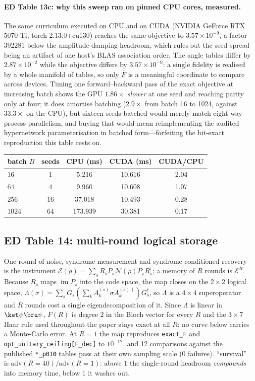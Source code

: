 \documentclass[10pt,a4paper]{article}
\begin{document}
\paragraph*{ED Table 13c: why this sweep ran on pinned CPU cores, measured.}
The same curriculum executed on CPU and on CUDA (NVIDIA GeForce RTX 5070 Ti, torch 2.13.0+cu130) reaches the same
objective to $3.57\times 10^{-9}$, a factor $392281$ below the amplitude-damping headroom, which rules
out the seed spread being an artifact of one host's BLAS association order.  The
angle tables differ by $2.87\times 10^{-2}$ while the objective differs by $3.57\times 10^{-9}$: a single fidelity is
realised by a whole manifold of tables, so only $\bar F$ is a meaningful coordinate
to compare across devices.  Timing one forward--backward pass of the exact
objective at increasing batch shows the GPU $1.86\times$ \emph{slower} at one seed
and reaching parity only at four; it does amortise batching ($2.9\times$ from
batch 16 to 1024, against $33.3\times$ on the CPU), but sixteen seeds batched would
merely match eight-way process parallelism, and buying that would mean
reimplementing the audited hypernetwork parameterisation in batched
form---forfeiting the bit-exact reproduction this table rests on.
\begin{center}\begin{tabular}{lcccc}
\toprule batch $B$ & seeds & CPU (ms) & CUDA (ms) & CUDA/CPU \\ \midrule
$16$ & $1$ & 5.216 & 10.616 & 2.04 \\
$64$ & $4$ & 9.960 & 10.608 & 1.07 \\
$256$ & $16$ & 37.018 & 10.493 & 0.28 \\
$1024$ & $64$ & 173.939 & 30.381 & 0.17 \\
\bottomrule\end{tabular}\end{center}

\subsection*{ED Table 14: multi-round logical storage}
One round of noise, syndrome measurement and syndrome-conditioned recovery is the
instrument $\mathcal{E}(\rho)=\sum_sR_sP_s\mathcal{N}(\rho)P_sR_s^\dagger$; a
memory of $R$ rounds is $\mathcal{E}^R$.  Because $R_s$ maps
$\operatorname{im}P_s$ into the code space, the map closes on the $2\times2$
logical space,
$\Lambda(\sigma)=\sum_sG_s(\sum_kA_k^{(s)}\sigma A_k^{(s)\dagger})G_s^\dagger$,
so $\Lambda$ is a $4\times4$ superoperator and $R$ rounds cost a single
eigendecomposition of it.  Since $\Lambda$ is linear in $\ket\psi\bra\psi$,
$F(R)$ is degree $2$ in the Bloch vector for every $R$ and the $3\times7$ Haar
rule used throughout the paper stays exact at all $R$: no curve below carries a
Monte-Carlo error.  At $R=1$ the map reproduces \texttt{exact\_F} and
\texttt{opt\_unitary\_ceiling[F\_dec]} to $10^{-12}$, and 12 comparisons
against the published \texttt{*\_p010} tables pass at their own sampling scale
(0 failures).  ``survival'' is
$\mathrm{adv}(R{=}40)/\mathrm{adv}(R{=}1)$: above $1$ the single-round headroom
\emph{compounds} into memory time, below $1$ it washes out.
\end{document}
